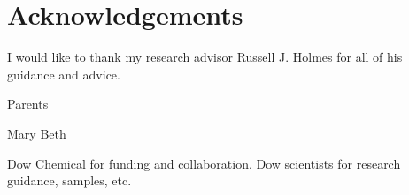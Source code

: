 \documentclass[../thesis.tex]{subfiles}
\begin{document}
\section*{Acknowledgements}

I would like to thank my research advisor Russell J. Holmes for all of his guidance and advice.

Parents

Mary Beth

Dow Chemical for funding and collaboration.  Dow scientists for research guidance, samples, etc.

\pagebreak
\end{document}
